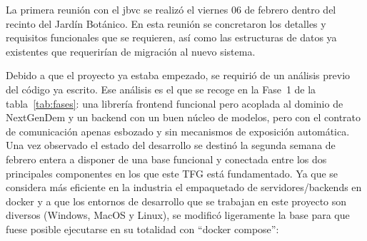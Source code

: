 La primera reunión con el \gls{jbvc} se realizó el viernes 06 de febrero dentro del recinto del 
Jardín Botánico. En esta reunión se concretaron los detalles y requisitos funcionales que se requieren, 
así como las estructuras de datos ya existentes que requerirían de migración al nuevo sistema. 

Debido a que el proyecto ya estaba empezado, se requirió de un análisis previo del código ya escrito.
Ese análisis es el que se recoge en la Fase~1 de la tabla~\ref{tab:fases}: una librería frontend
funcional pero acoplada al dominio de NextGenDem y un backend con un buen núcleo de modelos, pero
con el contrato de comunicación apenas esbozado y sin mecanismos de exposición automática.
Una vez observado el estado del desarrollo se destinó la segunda semana de febrero entera
a disponer de una base funcional y conectada entre los dos principales componentes en los que este TFG 
está fundamentado. Ya que se considera más eficiente en la industria el empaquetado de 
servidores/backends en \gls{docker} y a que los entornos de desarrollo que se trabajan en este proyecto 
son diversos (Windows, MacOS y Linux), se modificó ligeramente la base para que fuese posible ejecutarse en 
su totalidad con ``docker compose'':


